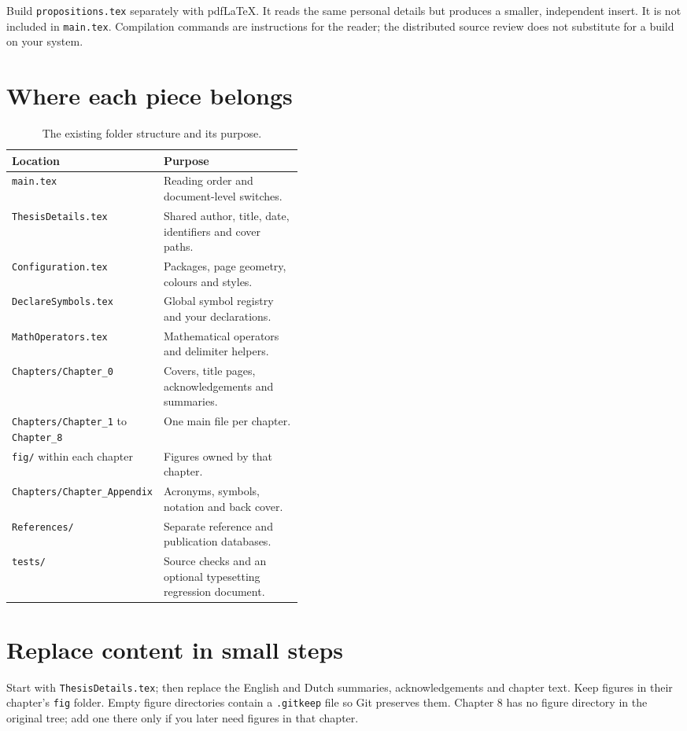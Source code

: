 Build \texttt{propositions.tex} separately with pdfLaTeX. It reads the same
personal details but produces a smaller, independent insert. It is not included
in \texttt{main.tex}. Compilation commands are instructions for the reader;
the distributed source review does not substitute for a build on your system.

\section{Where each piece belongs}
\begin{table}[htbp]
\centering\small
\caption{The existing folder structure and its purpose.}
\label{tab:structure}
\begin{tabularx}{\linewidth}{@{}p{0.43\linewidth}X@{}}
\toprule
Location & Purpose\\\midrule
\texttt{main.tex} & Reading order and document-level switches.\\
\texttt{ThesisDetails.tex} & Shared author, title, date, identifiers and cover paths.\\
\texttt{Configuration.tex} & Packages, page geometry, colours and styles.\\
\texttt{DeclareSymbols.tex} & Global symbol registry and your declarations.\\
\texttt{MathOperators.tex} & Mathematical operators and delimiter helpers.\\
\texttt{Chapters/Chapter\_0} & Covers, title pages, acknowledgements and summaries.\\
\texttt{Chapters/Chapter\_1} to \texttt{Chapter\_8} & One main file per chapter.\\
\texttt{fig/} within each chapter & Figures owned by that chapter.\\
\texttt{Chapters/Chapter\_Appendix} & Acronyms, symbols, notation and back cover.\\
\texttt{References/} & Separate reference and publication databases.\\
\texttt{tests/} & Source checks and an optional typesetting regression document.\\
\bottomrule
\end{tabularx}
\end{table}

\section{Replace content in small steps}
Start with \texttt{ThesisDetails.tex}; then replace the English and Dutch
summaries, acknowledgements and chapter text. Keep figures in their chapter's
\texttt{fig} folder. Empty figure directories contain a \texttt{.gitkeep} file
so Git preserves them. Chapter 8 has no figure directory in the original tree;
add one there only if you later need figures in that chapter.

